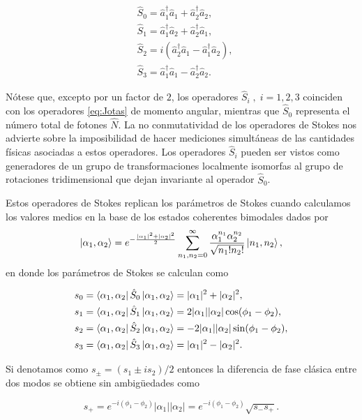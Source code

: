     \begin{align}
        &\hat{S}_0 = \hat{a}_1^\dagger\hat{a}_1 + \hat{a}_2^\dagger\hat{a}_2,\\
        & \hat{S}_1 = \hat{a}_1^\dagger\hat{a}_2 + \hat{a}_2^\dagger\hat{a}_1,\\
        & \hat{S}_2 = i\left( \hat{a}_2^\dagger\hat{a}_1 - \hat{a}_1^\dagger\hat{a}_2 \right),\\
        & \hat{S}_3 = \hat{a}_1^\dagger \hat{a}_1 - \hat{a}_2^\dagger \hat{a}_2.
    \end{align}

    Nótese que, excepto por un factor de $2$, los operadores $\hat{S}_i\;,\; i=1,2,3$ coinciden con los operadores \ref{eq:Jotas} de momento angular, mientras que $\hat{S}_0$ representa el número total de fotones $\hat{N}$. La no conmutatividad de los operadores de Stokes nos advierte sobre la imposibilidad de hacer mediciones simultáneas de las cantidades físicas asociadas a estos operadores. Los operadores $\hat{S}_i$ pueden ser vistos como generadores de un grupo de transformaciones localmente isomorfas al grupo de rotaciones tridimensional que dejan invariante al operador $\hat{S}_0$.

    Estos operadores de Stokes replican los parámetros de Stokes cuando calculamos los valores medios en la base de los estados coherentes bimodales dados por
    \begin{equation}
        \ket{\alpha_1,\alpha_2} = e^{-\frac{|\alpha_1|^2+|\alpha_2|^2}{2}}\sum_{n_1,n_2=0}^\infty \frac{\alpha_1^{n_1}\alpha_2^{n_2}}{\sqrt{n_1! n_2!}}\ket{n_1,n_2},
    \end{equation}
    en donde los parámetros de Stokes se calculan como

    \begin{align}
        & s_0 = \bra{\alpha_1,\alpha_2}\hat{S}_0 \ket{\alpha_1,\alpha_2} = |\alpha_1|^2 + |\alpha_2|^2,\\
        & s_1 = \bra{\alpha_1,\alpha_2}\hat{S}_1 \ket{\alpha_1,\alpha_2} = 2|\alpha_1||\alpha_2|\cos(\phi_1-\phi_2), \\
        & s_2 = \bra{\alpha_1,\alpha_2}\hat{S}_2 \ket{\alpha_1,\alpha_2} = -2|\alpha_1||\alpha_2|\sin(\phi_1-\phi_2), \\
        & s_3 = \bra{\alpha_1,\alpha_2}\hat{S}_3 \ket{\alpha_1,\alpha_2} = |\alpha_1|^2 - |\alpha_2|^2.
    \end{align} 

    Si denotamos como $s_\pm = (s_1\pm is_2)/2$ entonces la diferencia de fase clásica entre dos modos se obtiene sin ambigüedades como

    \begin{equation}
        s_+ = e^{-i(\phi_1-\phi_2)}|\alpha_1||\alpha_2| = e^{-i(\phi_1-\phi_2)}\sqrt{s_-s_+}.
    \end{equation}